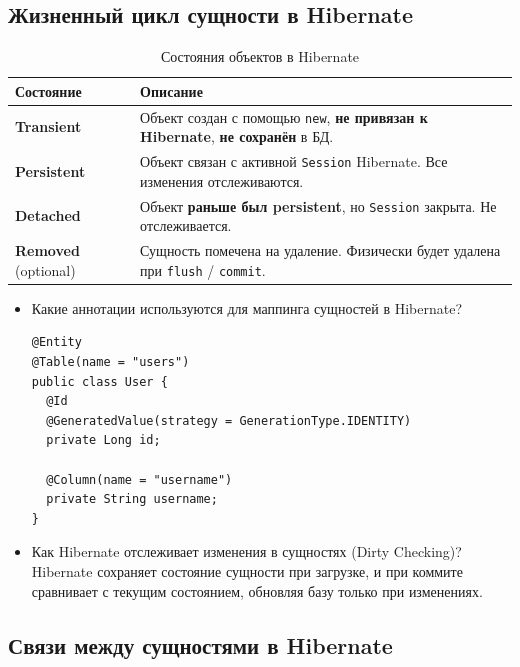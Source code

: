 \documentclass[a4paper,14pt]{article}
\begin{document}
\subsection{Жизненный цикл сущности в Hibernate}
\begin{table}[h]
    \centering
    \begin{tabular}{|l|p{10cm}|}
    \hline
    \textbf{Состояние} & \textbf{Описание} \\
    \hline
    \textbf{Transient} & Объект создан с помощью \texttt{new}, \textbf{не привязан к Hibernate}, \textbf{не сохранён} в БД. \\
    \hline
    \textbf{Persistent} & Объект связан с активной \texttt{Session} Hibernate. Все изменения отслеживаются. \\
    \hline
    \textbf{Detached} & Объект \textbf{раньше был persistent}, но \texttt{Session} закрыта. Не отслеживается. \\
    \hline
    \textbf{Removed} (optional) & Сущность помечена на удаление. Физически будет удалена при \texttt{flush} / \texttt{commit}. \\
    \hline
    \end{tabular}
    \caption{Состояния объектов в Hibernate}
    \end{table}    

\begin{itemize}
\item Какие аннотации используются для маппинга сущностей в Hibernate? \\
\begin{lstlisting}[style=javastyle]
@Entity
@Table(name = "users")
public class User {
  @Id
  @GeneratedValue(strategy = GenerationType.IDENTITY)
  private Long id;

  @Column(name = "username")
  private String username;
}
\end{lstlisting}

\item Как Hibernate отслеживает изменения в сущностях (Dirty Checking)? \\
Hibernate сохраняет состояние сущности при загрузке, и при коммите сравнивает с текущим состоянием, обновляя базу только при изменениях.
\end{itemize}

\subsection{Связи между сущностями в Hibernate}
\end{document}
